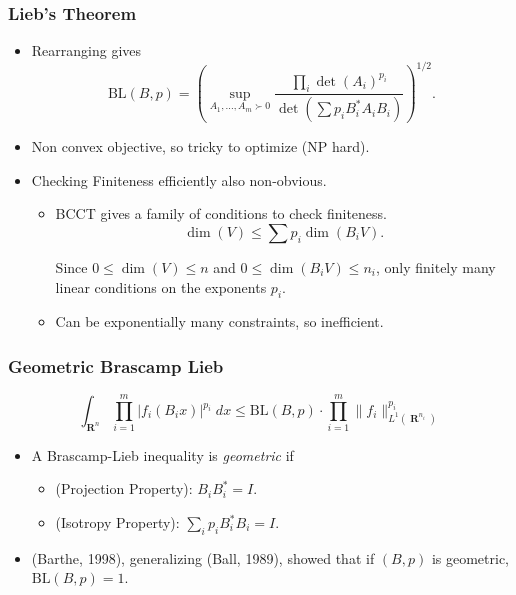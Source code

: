 \documentclass[handout,usenames,dvipsnames,12pt]{beamer}
\DeclareMathOperator{\RR}{\mathbf{R}}
\begin{document}
\begin{frame}
    \frametitle{Lieb's Theorem}

    \begin{itemize}
        \item Rearranging gives
        \[ \text{BL}(B,p) = \left( \sup_{A_1,\dots,A_m \succ 0} \frac{\prod_i \det(A_i)^{p_i}}{\det(\sum p_i B_i^* A_i B_i)} \right)^{1/2}. \]

        \pause
        \item Non convex objective, so tricky to optimize (NP hard).

        \pause
        \item Checking Finiteness efficiently also non-obvious.

        \begin{itemize}
            \pause
            \item BCCT gives a family of conditions to check finiteness.
            \[ \dim(V) \leq \sum p_i \dim(B_i V). \]
            
            \pause
            Since $0 \leq \dim(V) \leq n$ and $0 \leq \dim(B_i V) \leq n_i$, only finitely many linear conditions on the exponents $p_i$.
    
            \pause
            \item Can be exponentially many constraints, so inefficient.
        \end{itemize}
    \end{itemize}
\end{frame}

\begin{frame}
    \frametitle{Geometric Brascamp Lieb}

    \vspace{-1.5em}
    \[ \int_{\RR^n} \prod_{i = 1}^m |f_i(B_i x)|^{p_i}\; dx \leq \text{BL}(B,p) \cdot \prod_{i = 1}^m \| f_i \|_{L^1(\RR^{n_i})}^{p_i} \]

    \begin{itemize}
        \pause
        \item A Brascamp-Lieb inequality is \emph{geometric} if
        \begin{itemize}
            \item (Projection Property): $B_i B_i^* = I$.

            \item (Isotropy Property): $\sum_i p_i B_i^* B_i = I$.
        \end{itemize}

        \pause
        \item (Barthe, 1998), generalizing (Ball, 1989), showed that if $(B,p)$ is geometric, $\text{BL}(B,p) = 1$.
    \end{itemize}
\end{frame}
\end{document}
